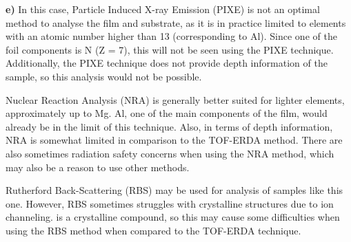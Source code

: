\textbf{e)} In this case, Particle Induced X-ray Emission (PIXE) is not an optimal method to analyse the film and substrate, as it is in practice limited to elements with an atomic number higher than 13 (corresponding to Al). Since one of the foil components is N (Z = 7), this will not be seen using the PIXE technique. Additionally, the PIXE technique does not provide depth information of the sample, so this analysis would not be possible.

Nuclear Reaction Analysis (NRA) is generally better suited for lighter elements, approximately up to Mg. Al, one of the main components of the film, would already be in the limit of this technique. Also, in terms of depth information, NRA is somewhat limited in comparison to the TOF-ERDA method. There are also sometimes radiation safety concerns when using the NRA method, which may also be a reason to use other methods.

Rutherford Back-Scattering (RBS) may be used for analysis of samples like this one. However, RBS sometimes struggles with crystalline structures due to ion channeling.  is a crystalline compound, so this may cause some difficulties when using the RBS method when compared to the TOF-ERDA technique.



